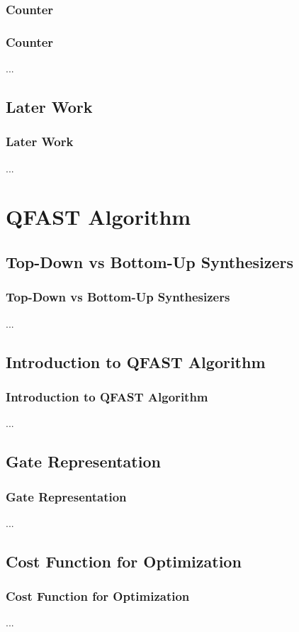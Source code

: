 \documentclass[aspectratio=1610]{beamer}
\begin{document}
\subsubsection{Counter}
\begin{frame}
\frametitle{Counter}
...
\end{frame}

\subsection{Later Work}
\begin{frame}
\frametitle{Later Work}
...
\end{frame}

\section{QFAST Algorithm}

\subsection{Top-Down vs Bottom-Up Synthesizers}
\begin{frame}
\frametitle{Top-Down vs Bottom-Up Synthesizers}
...
\end{frame}

\subsection{Introduction to QFAST Algorithm}
\begin{frame}
\frametitle{Introduction to QFAST Algorithm}
...
\end{frame}

\subsection{Gate Representation}
\begin{frame}
\frametitle{Gate Representation}
...
\end{frame}

\subsection{Cost Function for Optimization}
\begin{frame}
\frametitle{Cost Function for Optimization}
...
\end{frame}
\end{document}
